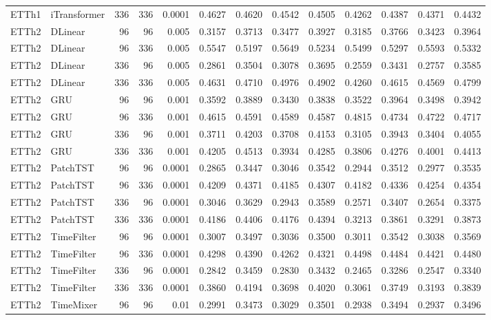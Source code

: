 \begin{longtable}{@{}llrrr*{8}{r}@{}}
ETTh1 & iTransformer & 336 & 336 & 0.0001 & 0.4627 & 0.4620 & 0.4542 & 0.4505 & 0.4262 & 0.4387 & 0.4371 & 0.4432 \\
ETTh2 & DLinear & 96 & 96 & 0.005 & 0.3157 & 0.3713 & 0.3477 & 0.3927 & 0.3185 & 0.3766 & 0.3423 & 0.3964 \\
ETTh2 & DLinear & 96 & 336 & 0.005 & 0.5547 & 0.5197 & 0.5649 & 0.5234 & 0.5499 & 0.5297 & 0.5593 & 0.5332 \\
ETTh2 & DLinear & 336 & 96 & 0.005 & 0.2861 & 0.3504 & 0.3078 & 0.3695 & 0.2559 & 0.3431 & 0.2757 & 0.3585 \\
ETTh2 & DLinear & 336 & 336 & 0.005 & 0.4631 & 0.4710 & 0.4976 & 0.4902 & 0.4260 & 0.4615 & 0.4569 & 0.4799 \\
ETTh2 & GRU & 96 & 96 & 0.001 & 0.3592 & 0.3889 & 0.3430 & 0.3838 & 0.3522 & 0.3964 & 0.3498 & 0.3942 \\
ETTh2 & GRU & 96 & 336 & 0.001 & 0.4615 & 0.4591 & 0.4589 & 0.4587 & 0.4815 & 0.4734 & 0.4722 & 0.4717 \\
ETTh2 & GRU & 336 & 96 & 0.001 & 0.3711 & 0.4203 & 0.3708 & 0.4153 & 0.3105 & 0.3943 & 0.3404 & 0.4055 \\
ETTh2 & GRU & 336 & 336 & 0.001 & 0.4205 & 0.4513 & 0.3934 & 0.4285 & 0.3806 & 0.4276 & 0.4001 & 0.4413 \\
ETTh2 & PatchTST & 96 & 96 & 0.0001 & 0.2865 & 0.3447 & 0.3046 & 0.3542 & 0.2944 & 0.3512 & 0.2977 & 0.3535 \\
ETTh2 & PatchTST & 96 & 336 & 0.0001 & 0.4209 & 0.4371 & 0.4185 & 0.4307 & 0.4182 & 0.4336 & 0.4254 & 0.4354 \\
ETTh2 & PatchTST & 336 & 96 & 0.0001 & 0.3046 & 0.3629 & 0.2943 & 0.3589 & 0.2571 & 0.3407 & 0.2654 & 0.3375 \\
ETTh2 & PatchTST & 336 & 336 & 0.0001 & 0.4186 & 0.4406 & 0.4176 & 0.4394 & 0.3213 & 0.3861 & 0.3291 & 0.3873 \\
ETTh2 & TimeFilter & 96 & 96 & 0.0001 & 0.3007 & 0.3497 & 0.3036 & 0.3500 & 0.3011 & 0.3542 & 0.3038 & 0.3569 \\
ETTh2 & TimeFilter & 96 & 336 & 0.0001 & 0.4298 & 0.4390 & 0.4262 & 0.4321 & 0.4498 & 0.4484 & 0.4421 & 0.4480 \\
ETTh2 & TimeFilter & 336 & 96 & 0.0001 & 0.2842 & 0.3459 & 0.2830 & 0.3432 & 0.2465 & 0.3286 & 0.2547 & 0.3340 \\
ETTh2 & TimeFilter & 336 & 336 & 0.0001 & 0.3860 & 0.4194 & 0.3698 & 0.4020 & 0.3061 & 0.3749 & 0.3193 & 0.3839 \\
ETTh2 & TimeMixer & 96 & 96 & 0.01 & 0.2991 & 0.3473 & 0.3029 & 0.3501 & 0.2938 & 0.3494 & 0.2937 & 0.3496 \\

\end{longtable}
